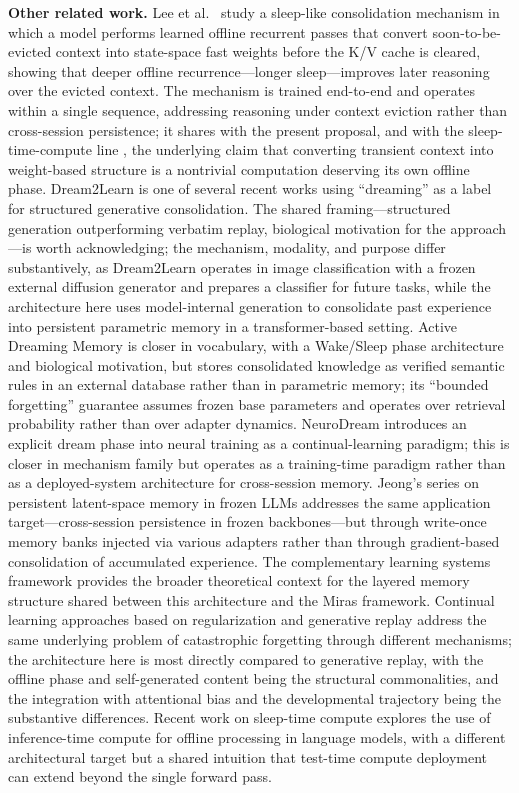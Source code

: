 \documentclass[11pt]{article}
\begin{document}
\textbf{Other related work.} Lee et al.\ \cite{lee2026sleep} study a sleep-like consolidation mechanism in which a model performs learned offline recurrent passes that convert soon-to-be-evicted context into state-space fast weights before the K/V cache is cleared, showing that deeper offline recurrence---longer sleep---improves later reasoning over the evicted context. The mechanism is trained end-to-end and operates within a single sequence, addressing reasoning under context eviction rather than cross-session persistence; it shares with the present proposal, and with the sleep-time-compute line \cite{lin2025}, the underlying claim that converting transient context into weight-based structure is a nontrivial computation deserving its own offline phase. Dream2Learn \cite{dream2learn2026} is one of several recent works using ``dreaming'' as a label for structured generative consolidation. The shared framing---structured generation outperforming verbatim replay, biological motivation for the approach---is worth acknowledging; the mechanism, modality, and purpose differ substantively, as Dream2Learn operates in image classification with a frozen external diffusion generator and prepares a classifier for future tasks, while the architecture here uses model-internal generation to consolidate past experience into persistent parametric memory in a transformer-based setting. Active Dreaming Memory \cite{adm2025} is closer in vocabulary, with a Wake/Sleep phase architecture and biological motivation, but stores consolidated knowledge as verified semantic rules in an external database rather than in parametric memory; its ``bounded forgetting'' guarantee assumes frozen base parameters and operates over retrieval probability rather than over adapter dynamics. NeuroDream \cite{neurodream2024} introduces an explicit dream phase into neural training as a continual-learning paradigm; this is closer in mechanism family but operates as a training-time paradigm rather than as a deployed-system architecture for cross-session memory. Jeong's series on persistent latent-space memory in frozen LLMs \cite{jeong2026encdec, jeong2026deconly} addresses the same application target---cross-session persistence in frozen backbones---but through write-once memory banks injected via various adapters rather than through gradient-based consolidation of accumulated experience. The complementary learning systems framework \cite{mcclelland1995} provides the broader theoretical context for the layered memory structure shared between this architecture and the Miras framework. Continual learning approaches based on regularization \cite{kirkpatrick2017} and generative replay \cite{shin2017, tadros2022} address the same underlying problem of catastrophic forgetting through different mechanisms; the architecture here is most directly compared to generative replay, with the offline phase and self-generated content being the structural commonalities, and the integration with attentional bias and the developmental trajectory being the substantive differences. Recent work on sleep-time compute \cite{lin2025} explores the use of inference-time compute for offline processing in language models, with a different architectural target but a shared intuition that test-time compute deployment can extend beyond the single forward pass.
\end{document}

